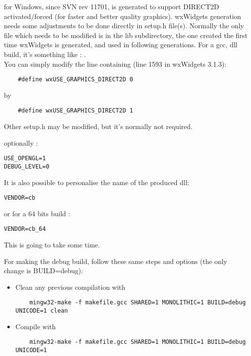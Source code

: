 \codeblocks for Windows, since SVN rev 11701, is generated to support DIRECT2D activated/forced (for faster and better quality graphics). wxWidgets generation needs some adjustments to be done directly in setup.h file(s). Normally the only file which needs to be modified is in the lib subdirectory, the one created the first time wxWidgets is generated, and used in following generations. For a gcc, dll build, it's something like : .\\
You can simply modify the line containing (line 1593 in wxWidgets 3.1.3):
\begin{verbatim}
    #define wxUSE_GRAPHICS_DIRECT2D 0 
\end{verbatim}
by
\begin{verbatim}
    #define wxUSE_GRAPHICS_DIRECT2D 1  
\end{verbatim}
Other setup.h may be modified, but it's normally not required.

optionally :
\begin{verbatim}
USE_OPENGL=1
DEBUG_LEVEL=0
\end{verbatim}


It is also possible to personalise the name of the produced dll:
\begin{verbatim}
VENDOR=cb
\end{verbatim}
or for a 64 bits build :
\begin{verbatim}
VENDOR=cb_64
\end{verbatim}


This is going to take some time.

For making the debug build, follow these same steps and options (the only change is BUILD=debug):

\begin{itemize}
\item Clean any previous compilation with
	\begin{verbatim}
	mingw32-make -f makefile.gcc SHARED=1 MONOLITHIC=1 BUILD=debug UNICODE=1 clean
	\end{verbatim}
\item Compile with
	\begin{verbatim}
	mingw32-make -f makefile.gcc SHARED=1 MONOLITHIC=1 BUILD=debug UNICODE=1
	\end{verbatim}
\end{itemize}

